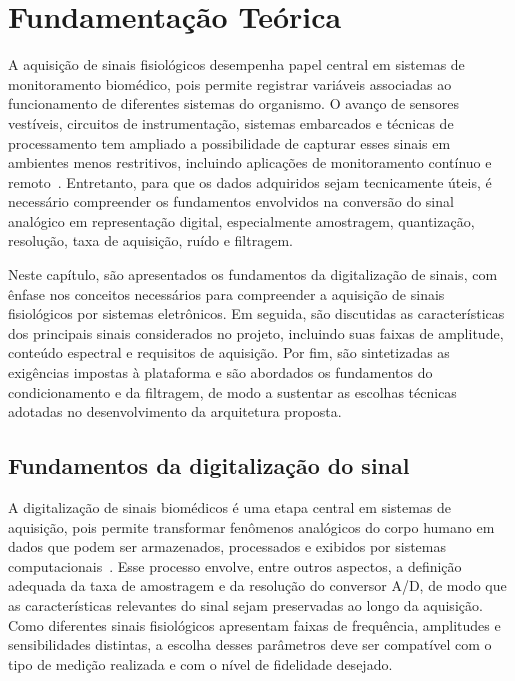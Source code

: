 \documentclass[a4paper,12pt]{fcte}
\begin{document}
\chapter{Fundamentação Teórica}
\label{chap:FT}

A aquisição de sinais fisiológicos desempenha papel central em sistemas de monitoramento biomédico, pois permite registrar variáveis associadas ao funcionamento de diferentes sistemas do organismo. O avanço de sensores vestíveis, circuitos de instrumentação, sistemas embarcados e técnicas de processamento tem ampliado a possibilidade de capturar esses sinais em ambientes menos restritivos, incluindo aplicações de monitoramento contínuo e remoto~\cite{ates2022wearable_sensors,vaghasiya2023wearable_telehealth}. Entretanto, para que os dados adquiridos sejam tecnicamente úteis, é necessário compreender os fundamentos envolvidos na conversão do sinal analógico em representação digital, especialmente amostragem, quantização, resolução, taxa de aquisição, ruído e filtragem.

Neste capítulo, são apresentados os fundamentos da digitalização de sinais, com ênfase nos conceitos necessários para compreender a aquisição de sinais fisiológicos por sistemas eletrônicos. Em seguida, são discutidas as características dos principais sinais considerados no projeto, incluindo suas faixas de amplitude, conteúdo espectral e requisitos de aquisição. Por fim, são sintetizadas as exigências impostas à plataforma e são abordados os fundamentos do condicionamento e da filtragem, de modo a sustentar as escolhas técnicas adotadas no desenvolvimento da arquitetura proposta.

\section{Fundamentos da digitalização do sinal}

A digitalização de sinais biomédicos é uma etapa central em sistemas de aquisição, pois permite transformar fenômenos analógicos do corpo humano em dados que podem ser armazenados, processados e exibidos por sistemas computacionais~\cite{kester2008mt002,kester2008mt001}. Esse processo envolve, entre outros aspectos, a definição adequada da taxa de amostragem e da resolução do conversor A/D, de modo que as características relevantes do sinal sejam preservadas ao longo da aquisição. Como diferentes sinais fisiológicos apresentam faixas de frequência, amplitudes e sensibilidades distintas, a escolha desses parâmetros deve ser compatível com o tipo de medição realizada e com o nível de fidelidade desejado.
\end{document}
